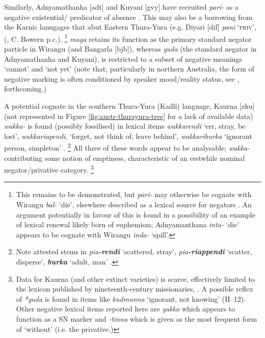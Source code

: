 \documentclass[output=paper]{langsci/langscibook}
\begin{document}
Similarly, Adnyamathanha [adt] and Kuyani
    [gvy] have recruited \textit{pari-} as a negative existential\slash
    predicator of absence \citep[141]{Hercus1999}. This may also be a
    borrowing from the Karnic lanugages that abut Eastern Thura-Yura (e.g.
    Diyari [dif] \textit{pani} \textsc{`priv'}, (\citealt{Austin2011}, C.
    Bowern p.c.).%
%
\footnote{This remains to be demonstrated, but
    \textit{pari-} may otherwise be cognate with Wirangu \textit{bal-}
    `die', elsewhere described as a lexical source for negators
    \parencites{Veselinova2013}{Gelderen2019}. An argument
    potentially in favour of this is found in a possibility of an example
    of lexical renewal likely born of euphemism; Adnyamanthana
    \textit{inta-} `die' appears to be cognate with Wirangu \textit{inda-}
    `spill'.}
%
\textit{maga} retains its function as the primary standard negator particle
    in Wirangu (and Bangarla [bjb]),  whereas
    \textit{guda} (the standard negator in Adnyamathanha
    and Kuyani), is restricted to a subset of negative meanings `cannot' and `not yet' (note that, particularly in northern Australia, the form of negative marking is often conditioned by speaker mood\slash reality status, see \citealt[225]{Miestamo2005}, \citeauthor{PhillipsFCb} forthcoming.)

    A potential cognate in the southern Thura-Yura (Kadli) language,
Kaurna [zku] (not represented in Figure \ref{fig:austr-thurayura-tree} for a lack of
    available data) \textit{wakka-} is found (possibly fossilised) in
    lexical items \textit{wakkarendi} `err, stray, be lost',
    \textit{wakkariapendi}, `forget, not think of, leave behind',
    \textit{wakkariburka} `ignorant person, simpleton'
    \citep[II--52]{SchurmannTeichelmann1840}.%
\footnote{Note attested stems in \textit{pia\textbf{-rendi}} `scattered,
    stray', \textit{pia\textbf{-riappendi}} `scatter, disperse',
    \textit{\textbf{burka}} `adult, man'
    \citep[II--4,38]{SchurmannTeichelmann1840}.} 
All three of these words appear to be analysable; \textit{wakka-}
contributing some notion of emptiness, characteristic of an erstwhile
nominal negator\slash privative category.%
%
\footnote{Data for Kaurna (and other extinct varieties) is
scarce, effectively limited to the lexicon published by nineteenth-century
missionaries, \citet{SchurmannTeichelmann1840}. A possible reflex of
\textit{*guda} is found in items like \textit{kudmunna} `ignorant, not
knowing' (II--12).  Other negative lexical items reported here are
\textit{yakko} which appears to function as a SN marker and \textit{-tinna}
which is given as the most frequent form of `without' (i.e. the
privative.)}
\end{document}
